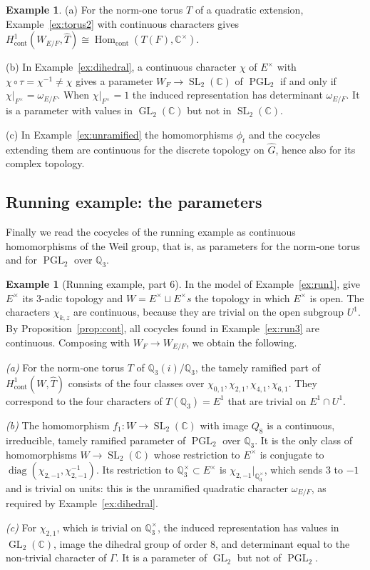 \documentclass[12pt,letterpaper]{article}
\numberwithin{equation}{section}
\theoremstyle{plain}
\theoremstyle{definition}
\newtheorem{example}[theorem]{Example}
\newcommand{\C}{\mathbb{C}}
\newcommand{\Q}{\mathbb{Q}}
\newcommand{\Gh}{\widehat{G}}
\newcommand{\Th}{\widehat{T}}
\DeclareMathOperator{\Hom}{Hom}
\DeclareMathOperator{\GL}{GL}
\DeclareMathOperator{\SL}{SL}
\DeclareMathOperator{\PGL}{PGL}
\DeclareMathOperator{\diag}{diag}
\begin{document}
\begin{example}\label{ex:langlands}
(a) For the norm-one torus $T$ of a quadratic extension,
Example~\ref{ex:torus2} with continuous characters gives
$H^1_{\mathrm{cont}}(W_{E/F},\Th)\cong\Hom_{\mathrm{cont}}(T(F),\C^\times)$.

(b) In Example~\ref{ex:dihedral}, a continuous character $\chi$ of
$E^\times$ with $\chi\circ\tau=\chi^{-1}\neq\chi$ gives a parameter
$W_F\to\SL_2(\C)$ of $\PGL_2$ if and only if
$\chi|_{F^\times}=\omega_{E/F}$. When $\chi|_{F^\times}=1$ the induced
representation has determinant $\omega_{E/F}$. It is a parameter with
values in $\GL_2(\C)$ but not in $\SL_2(\C)$.

(c) In Example~\ref{ex:unramified} the homomorphisms $\phi_t$ and the
cocycles extending them are continuous for the discrete topology on $\Gh$,
hence also for its complex topology.
\end{example}

\subsection{Running example: the parameters}\label{ss:run5}

Finally we read the cocycles of the running example as continuous
homomorphisms of the Weil group, that is, as parameters for the norm-one
torus and for $\PGL_2$ over $\Q_3$.

\begin{example}[Running example, part 6]\label{ex:run5}
In the model of Example~\ref{ex:run1}, give $E^\times$ its $3$-adic
topology and $W=E^\times\sqcup E^\times s$ the topology in which
$E^\times$ is open. The characters $\chi_{k,z}$ are continuous, because
they are trivial on the open subgroup $U^1$. By
Proposition~\ref{prop:cont}, all cocycles found in
Example~\ref{ex:run3} are continuous. Composing with $W_F\to W_{E/F}$, we
obtain the following.

\smallskip\noindent\emph{(a)} For the norm-one torus $T$ of
$\Q_3(i)/\Q_3$, the tamely ramified part of
$H^1_{\mathrm{cont}}(W,\Th)$ consists of the four classes over
$\chi_{0,1},\chi_{2,1},\chi_{4,1},\chi_{6,1}$. They correspond to the four
characters of $T(\Q_3)=E^1$ that are trivial on $E^1\cap U^1$.

\smallskip\noindent\emph{(b)} The homomorphism $f_1:W\to\SL_2(\C)$ with
image $Q_8$ is a continuous, irreducible, tamely ramified parameter of
$\PGL_2$ over $\Q_3$. It is the only class of homomorphisms
$W\to\SL_2(\C)$ whose restriction to $E^\times$ is conjugate to
$\diag(\chi_{2,-1},\chi_{2,-1}^{-1})$. Its restriction to
$\Q_3^\times\subset E^\times$ is $\chi_{2,-1}|_{\Q_3^\times}$, which sends
$3$ to $-1$ and is trivial on units: this is the unramified quadratic
character $\omega_{E/F}$, as required by Example~\ref{ex:dihedral}.

\smallskip\noindent\emph{(c)} For $\chi_{2,1}$, which is trivial on
$\Q_3^\times$, the induced representation has values in $\GL_2(\C)$, image
the dihedral group of order $8$, and determinant equal to the non-trivial
character of $\Gamma$. It is a parameter of $\GL_2$ but not of $\PGL_2$.
\end{example}
\end{document}
